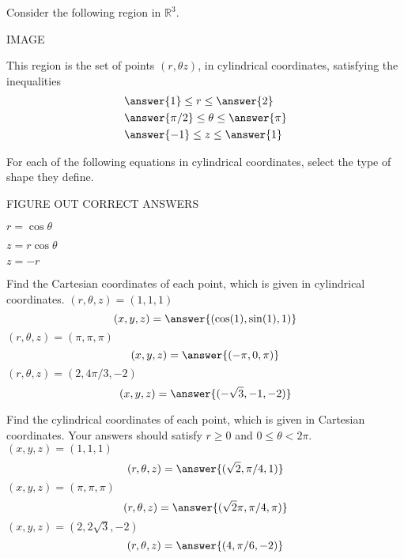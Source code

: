 \documentclass{ximera}
\begin{document}
\begin{problem}
Consider the following region in $\mathbb{R}^3$.

IMAGE

This region is the set of points $(r, \theta z)$, in cylindrical coordinates, satisfying the inequalities
\begin{align*}
&\answer{1}\leq r\leq \answer{2}\\
&\answer{\pi/2}\leq\theta\leq\answer{\pi}\\
&\answer{-1}\leq z\leq\answer{1}
\end{align*}

\end{problem}

\begin{problem}
For each of the following equations in cylindrical coordinates, select the type of shape they define.

FIGURE OUT CORRECT ANSWERS

$r = \cos\theta$
\begin{multipleChoice}
\end{multipleChoice}

$z = r\cos\theta$
\begin{multipleChoice}
\end{multipleChoice}

$z = -r$
\begin{multipleChoice}
\end{multipleChoice}
\end{problem}

\begin{problem}
Find the Cartesian coordinates of each point, which is given in cylindrical coordinates.
$(r,\theta,z) = (1,1,1)$
\[
(x,y,z) = \answer{(\cos(1), \sin(1), 1)}
\]
$(r,\theta,z) = (\pi,\pi,\pi)$
\[
(x,y,z) = \answer{(-\pi, 0, \pi)}
\]
$(r,\theta,z) = (2,4\pi/3,-2)$
\[
(x,y,z) = \answer{(-\sqrt{3}, -1, -2)}
\]
\end{problem}

\begin{problem}
Find the cylindrical coordinates of each point, which is given in Cartesian coordinates. Your answers should satisfy $r\geq 0$ and $0\leq \theta < 2\pi$.
$(x,y,z) = (1,1,1)$
\[
(r,\theta,z) = \answer{(\sqrt{2}, \pi/4, 1)}
\]
$(x,y,z) = (\pi,\pi,\pi)$
\[
(r,\theta,z) = \answer{(\sqrt{2}\pi, \pi/4, \pi)}
\]
$(x,y,z) = (2,2\sqrt{3},-2)$
\[
(r,\theta,z) = \answer{(4, \pi/6, -2)}
\]
\end{problem}
\end{document}
